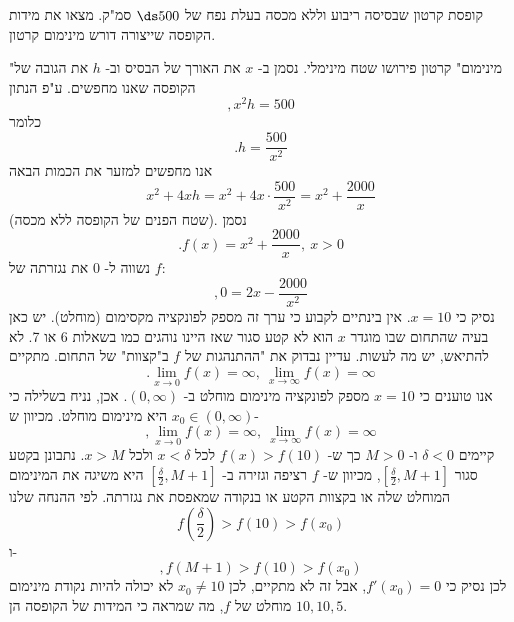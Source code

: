 קופסת קרטון שבסיסה ריבוע וללא מכסה בעלת נפח של $\ds 500$ סמ"ק.
מצאו את מידות הקופסה שייצורה דורש מינימום קרטון.
\begin{solbox}
"מינימום" קרטון פירושו שטח מינימלי.
נסמן ב-
$x$
את האורך של הבסיס וב-
$h$
את הגובה של הקופסה שאנו מחפשים.
ע"פ הנתון
$$,x^2h=500$$
כלומר
$$.h=\frac{500}{x^2}$$
אנו מחפשים למזער את הכמות הבאה
$$x^2+4xh=x^2+4x\cdot\frac{500}{x^2}=x^2+\frac{2000}{x}$$
(שטח הפנים של הקופסה ללא מכסה).
נסמן
$$.f(x)=x^2+\frac{2000}{x},\ x>0$$
נשווה ל-
$0$
את נגזרתה של
$f$:
$$,0=2x-\frac{2000}{x^2}$$
נסיק כי
$x=10$.
אין בינתיים לקבוע כי ערך זה מספק לפונקציה מקסימום
(מוחלט).
יש כאן בעיה שהתחום שבו מוגדר
$x$
הוא לא קטע סגור שאז היינו נוהגים כמו בשאלות
6
או
7.
לא להתיאש, יש מה לעשות.
עדיין נבדוק את "ההתנהגות של
$f$
ב"קצוות" של התחום.
מתקיים
$$.\lim_{x\to0}f(x)=\infty,\ \lim_{x\to\infty}f(x)=\infty$$
אנו טוענים כי
$x=10$
מספק לפונקציה מינימום מוחלט ב-
$(0,\infty)$.
אכן, נניח בשלילה כי
$x_0\in(0,\infty)$
היא מינימום מוחלט.
מכיוון ש-
$$,\lim_{x\to0}f(x)=\infty,\ \lim_{x\to\infty}f(x)=\infty$$
קיימים
$\delta<0$
ו-
$M>0$
כך ש-
$f(x)>f(10)$
לכל
$x<\delta$
ולכל
$x>M$.
נתבונן בקטע סגור
$[\frac{\delta}{2},M+1]$,
 מכיוון ש-
$f$
רציפה וגזירה ב-
$[\frac{\delta}{2},M+1]$
היא משיגה את המינימום המוחלט שלה או בקצוות הקטע או בנקודה
שמאפסת את נגזרתה.
לפי ההנחה שלנו
$$f(\frac{\delta}{2})>f(10)>f(x_0)$$
ו-
$$,f(M+1)>f(10)>f(x_0)$$
לכן נסיק כי
$f'(x_0)=0$,
אבל זה לא מתקיים, לכן
$x_0\neq 10$
לא יכולה להיות נקודת מינימום מוחלט של
$f$,
מה שמראה כי המידות של הקופסה הן
$10,10,5$.
\end{solbox}
